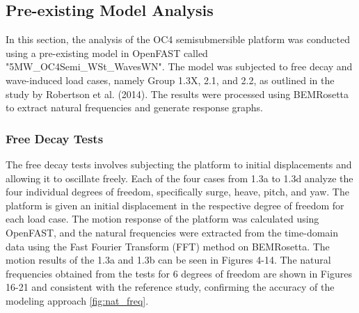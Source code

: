 \documentclass[a4paper]{article}
\begin{document}
\subsection{Pre-existing Model Analysis}

\hspace*{0.5cm}In this section, the analysis of the OC4 semisubmersible platform was conducted using a pre-existing model in OpenFAST called "5MW\_OC4Semi\_WSt\_WavesWN". The model was subjected to free decay and wave-induced load cases, namely Group 1.3X, 2.1, and 2.2, as outlined in the study by Robertson et al. (2014). The results were processed using BEMRosetta to extract natural frequencies and generate response graphs.

\subsubsection{Free Decay Tests}
\hspace*{0.5cm}The free decay tests involves subjecting the platform to initial displacements and allowing it to oscillate freely. Each of the four cases from 1.3a to 1.3d analyze the four individual degrees of freedom, specifically surge, heave, pitch, and yaw. The platform is given an initial displacement in the respective degree of freedom for each load case. The motion response of the platform was calculated using OpenFAST, and the natural frequencies were extracted from the time-domain data using the Fast Fourier Transform (FFT) method on BEMRosetta. The motion results of the 1.3a and 1.3b can be seen in Figures 4-14. The natural frequencies obtained from the tests for 6 degrees of freedom are shown in Figures 16-21 and consistent with the reference study, confirming the accuracy of the modeling approach \autoref{fig:nat_freq}.
\vspace{0.3cm}
\end{document}

